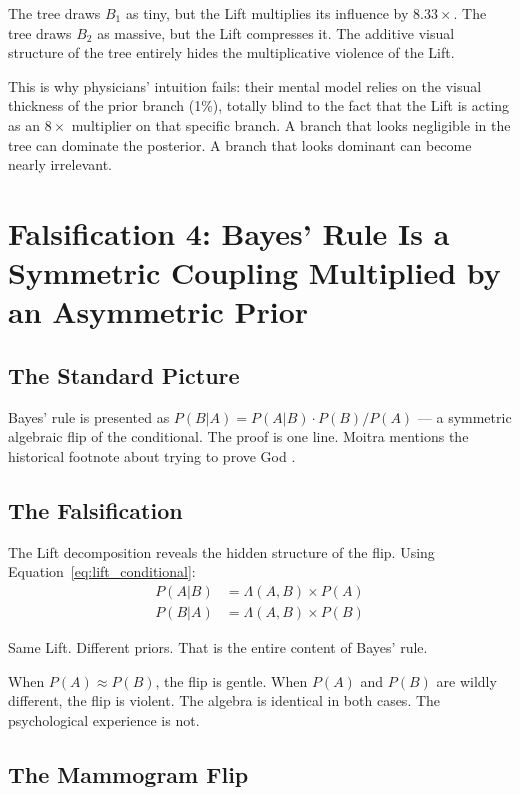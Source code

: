 \documentclass[12pt]{article}
\begin{document}
The tree draws $B_1$ as tiny, but the Lift multiplies its influence by $8.33\times$. The tree draws $B_2$ as massive, but the Lift compresses it. The additive visual structure of the tree entirely hides the multiplicative violence of the Lift.

This is why physicians' intuition fails: their mental model relies on the visual thickness of the prior branch (1\%), totally blind to the fact that the Lift is acting as an $8\times$ multiplier on that specific branch. A branch that looks negligible in the tree can dominate the posterior. A branch that looks dominant can become nearly irrelevant.

\section{Falsification 4: Bayes' Rule Is a Symmetric Coupling Multiplied by an Asymmetric Prior}

\subsection{The Standard Picture}

Bayes' rule is presented as $P(B|A) = P(A|B) \cdot P(B) / P(A)$ --- a symmetric algebraic flip of the conditional. The proof is one line. Moitra mentions the historical footnote about trying to prove God \cite{moitra2024}.

\subsection{The Falsification}

The Lift decomposition reveals the hidden structure of the flip. Using Equation~\ref{eq:lift_conditional}:
\begin{align}
P(A|B) &= \Lambda(A,B) \times P(A) \\
P(B|A) &= \Lambda(A,B) \times P(B)
\end{align}

Same Lift. Different priors. That is the entire content of Bayes' rule.

When $P(A) \approx P(B)$, the flip is gentle. When $P(A)$ and $P(B)$ are wildly different, the flip is violent. The algebra is identical in both cases. The psychological experience is not.

\subsection{The Mammogram Flip}
\end{document}
